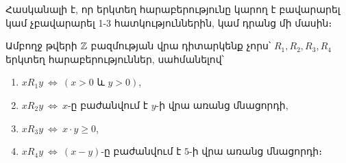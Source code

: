 \documentclass[./main.tex]{subfiles}
\begin{document}
\par Հասկանալի է, որ երկտեղ հարաբերությունը կարող է բավարարել կամ չբա\-վա\-րա\-րել 1-3 հատկություններին, կամ դրանց մի մասին։
\begin{example}\label{ch2ex8}
Ամբողջ թվերի $\mathbb{Z}$ բազմության վրա դիտարկենք չորս՝ $R_1, R_2, R_3, R_4$ երկտեղ հա\-րա\-բե\-րու\-թյուն\-ներ, սահմանելով՝
\begin{enumerate}
    \item [ա)] $xR_1y \ \Leftrightarrow \ (x>0 \textrm{ և } y>0)$,
    \item [բ)] $xR_2y \ \Leftrightarrow\ x$-ը բաժանվում է $y$-ի վրա առանց մնացորդի,
    \item [գ)] $xR_3y\ \Leftrightarrow\ x \cdot y\geq 0$,
    \item [դ)] $xR_4y\ \Leftrightarrow\ (x-y)$-ը բաժանվում է $5$-ի վրա առանց մնացորդի։
\end{enumerate}
\end{example} %
\end{document}
